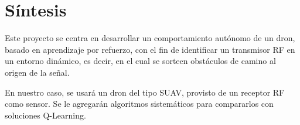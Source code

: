 \section{Síntesis}
\label{subsec:sintesis}

Este proyecto se centra en desarrollar un comportamiento autónomo de un dron, basado en aprendizaje por refuerzo, con el fin de identificar un transmisor \ac{RF} en un entorno dinámico, es decir, en el cual se sorteen obstáculos de camino al origen de la señal.


En nuestro caso, se usará un dron del tipo \ac{SUAV}, provisto de un receptor \ac{RF} como sensor. Se le agregarán algoritmos sistemáticos para compararlos con soluciones Q-Learning.